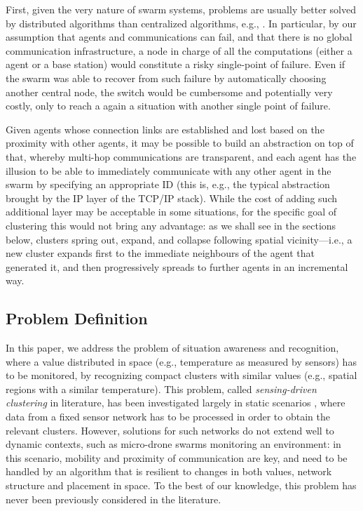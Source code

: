 {First, given the very nature of swarm systems, problems are usually better solved by distributed algorithms than centralized algorithms, e.g., \cite{hoshino:2013,DBLP:journals/asc/CruzNM17}. In particular, by our assumption that agents and communications can fail, and that there is no global communication infrastructure, a node in charge of all the computations (either a agent or a base station) would constitute a risky single-point of failure. Even if the swarm was able to recover from such failure by automatically choosing another central node, the switch would be cumbersome and potentially very costly, only to reach a again a situation with another single point of failure.

Given agents whose connection links are established and lost based on the proximity with other agents, it may be possible to build an abstraction on top of that, whereby multi-hop communications are transparent, and each agent has the illusion to be able to immediately communicate with any other agent in the swarm by specifying an appropriate ID (this is, e.g., the typical abstraction brought by the IP layer of the TCP/IP stack). While the cost of adding such additional layer may be acceptable in some situations, for the specific goal of clustering this would not bring any advantage: as we shall see in the sections below, clusters spring out, expand, and collapse following spatial vicinity---i.e., a new cluster expands first to the immediate neighbours of the agent that generated it, and then progressively spreads to further agents in an incremental way.
}

\subsection{Problem Definition}\label{ssec:problem-def}

In this paper, we address the problem of situation awareness and recognition, where a value distributed in space (e.g., temperature as measured by sensors) has to be monitored,
 by recognizing compact clusters with similar values (e.g., spatial regions with a similar temperature).
 This problem, called \emph{sensing-driven clustering} in literature, has been investigated largely in static scenarios \cite{DBLP:journals/jaihc/KucukBSK20,DBLP:journals/ijcomsys/PhamLPC10,DBLP:conf/ccnc/LinM07},
 where data from a fixed sensor network has to be processed in order to obtain the relevant clusters.
 However, solutions for such networks do not extend well to dynamic contexts, such as micro-drone swarms monitoring an environment:
 in this scenario, mobility and proximity of communication are key,
 and need to be handled by an algorithm that is resilient to changes in both values, network structure and placement in space.
 To the best of our knowledge, this problem has never been previously considered in the literature.


